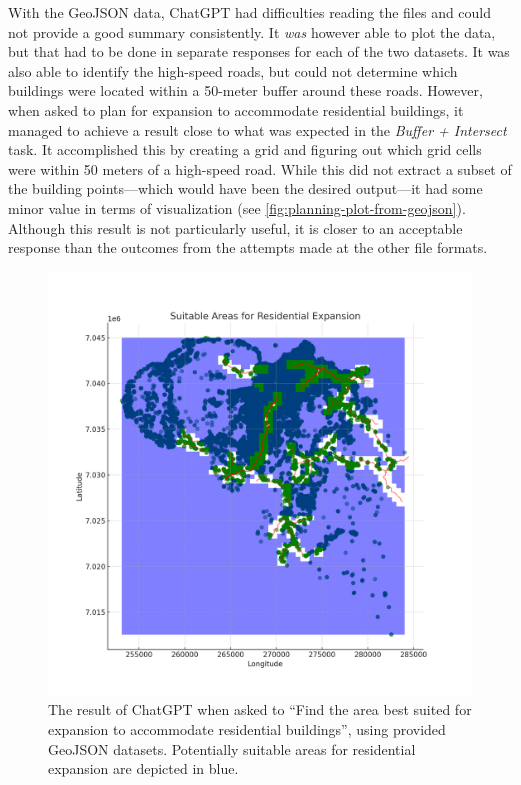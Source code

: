 With the GeoJSON data, ChatGPT had difficulties reading the files and could not provide a good summary consistently. It \textit{was} however able to plot the data, but that had to be done in separate responses for each of the two datasets. It was also able to identify the high-speed roads, but could not determine which buildings were located within a 50-meter buffer around these roads. However, when asked to plan for expansion to accommodate residential buildings, it managed to achieve a result close to what was expected in the \textit{Buffer + Intersect} task. It accomplished this by creating a grid and figuring out which grid cells were within 50 meters of a high-speed road. While this did not extract a subset of the building points---which would have been the desired output---it had some minor value in terms of visualization (see \autoref{fig:planning-plot-from-geojson}). Although this result is not particularly useful, it is closer to an acceptable response than the outcomes from the attempts made at the other file formats.

\begin{figure}
    \centering
    \includegraphics[width=\textwidth]{../figs/residential_expansion_areas_map.png}
    \caption{The result of ChatGPT when asked to \enquote{Find the area best suited for expansion to accommodate residential buildings}, using provided GeoJSON datasets. Potentially suitable areas for residential expansion  are depicted in blue.}
    \label{fig:planning-plot-from-geojson}
\end{figure}

